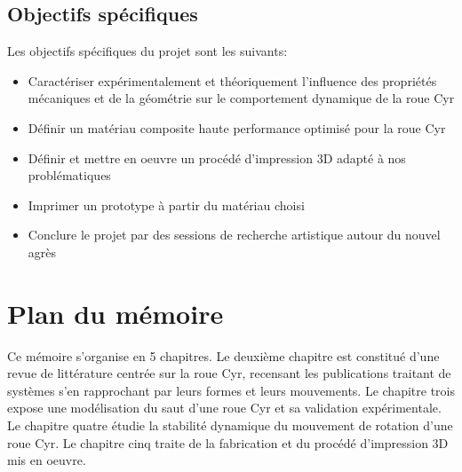 \subsection{Objectifs spécifiques}
Les objectifs spécifiques du projet sont les suivants:
\begin{itemize}
    \item Caractériser expérimentalement et théoriquement l’influence des propriétés mécaniques et de la géométrie sur le comportement dynamique de la roue Cyr
    \item Définir un matériau composite haute performance optimisé pour la roue Cyr
    \item Définir et mettre en oeuvre un procédé d'impression 3D adapté à nos problématiques
    \item Imprimer un prototype à partir du matériau choisi
    \item Conclure le projet par des sessions de recherche artistique autour du nouvel agrès
\end{itemize}


\section{Plan du mémoire}  %
Ce mémoire s'organise en 5 chapitres. Le deuxième chapitre est constitué d'une revue de littérature centrée sur la roue Cyr, recensant les publications traitant de systèmes s'en rapprochant par leurs formes et leurs mouvements. Le chapitre trois expose une modélisation du saut d'une roue Cyr et sa validation expérimentale. Le chapitre quatre étudie la stabilité dynamique du mouvement de rotation d'une roue Cyr. Le chapitre cinq traite de la fabrication et du procédé d'impression 3D mis en oeuvre.
